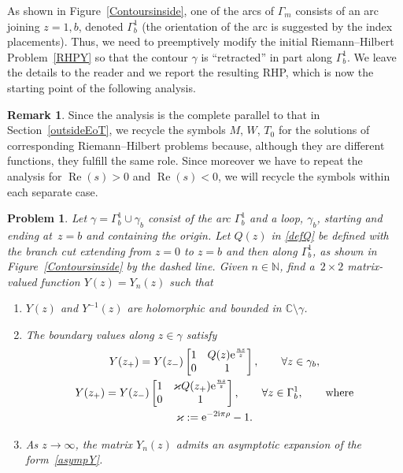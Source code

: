 \documentclass[pdftex]{sigma}
\numberwithin{equation}{section}
\newtheorem{problem}[Theorem]{Problem}
\theoremstyle{definition}
\newtheorem{Remark}[Theorem]{Remark}
\def\C{{\mathbb C}}
\def \Re{\operatorname{Re} }
\begin{document}
As shown in Figure~\ref{Contoursinside}, one of the arcs of $\Gamma_m$ consists of an arc joining $z=1,b$, denoted $\Gamma_b^1$ (the orientation of the arc is suggested by the index placements). Thus, we need to preemptively modify the initial Riemann--Hilbert Problem~\ref{RHPY} so that the contour $\gamma$ is ``retracted'' in part along $\Gamma_b^1$. We leave the details to the reader and we report the resulting RHP, which is now the starting point of the following analysis.

\begin{Remark}\label{MRN}
Since the analysis is the complete parallel to that in Section~\ref{outsideEoT}, we recycle the symbols $M$, $W$, $T_0$ for the solutions of corresponding Riemann--Hilbert problems because, although they are different functions, they fulfill the same role. Since moreover we have to repeat the analysis for $\Re(s)>0$ and $\Re(s)<0$, we will recycle the symbols within each separate case.
\end{Remark}
\begin{problem}\label{RHPYg1}
Let $\gamma = \Gamma_b^1 \cup \gamma_b$ consist of the arc $\Gamma_b^1$ and a loop, $\gamma_b$, starting and ending at~${z=b}$ and containing the origin. Let $Q(z)$ in \eqref{defQ} be defined with the branch cut extending from $z=0$ to $z=b$ and then along $\Gamma_b^1$, as shown in Figure~{\rm\ref {Contoursinside}} by the dashed line.
Given $n\in \mathbb N$,
find a~${2\times 2}$ matrix-valued function $Y(z)= Y_n(z)$ such that
\begin{enumerate}\itemsep=0pt
\item[$(1)$] $Y(z)$ and $Y^{-1}(z)$ are holomorphic and bounded in $\C\setminus \gamma$.
\item[$(2)$] The boundary values along $z\in \gamma$ satisfy
\begin{gather}
Y(z_+) = Y(z_-) \begin{bmatrix}
1&Q(z){\rm e}^{\frac {ns}z}\\
0 & 1
\end{bmatrix},\qquad \forall z\in \gamma_b,
\nonumber\\
Y(z_+) = Y(z_-) \begin{bmatrix}
1&\varkappa Q(z_+) {\rm e}^{\frac {ns}z}\\
0 & 1
\end{bmatrix}, \qquad \forall z\in \Gamma_b^1,\qquad
\text{where}\nonumber\\
\label{defkappa}
\varkappa:=
 {\rm e}^{-2{\rm i}\pi { {\rho}}}-1.
\end{gather}
\item[$(3)$] As $z\to \infty$, the matrix $Y_n(z)$ admits an asymptotic expansion of the form~\eqref{asympY}.
\end{enumerate}
\end{problem}
\end{document}
